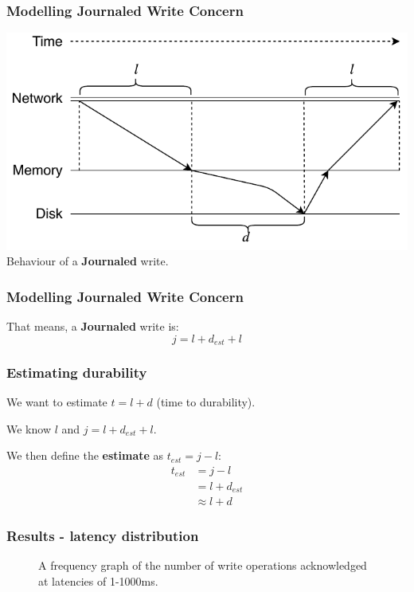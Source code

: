 \documentclass[numfooter,sectionpages,protectFrameTitle, progressbar, cblock, valigncolumns, addlogo]{beamer}
\begin{document}
\begin{frame}
    \frametitle{Modelling Journaled Write Concern}
    \centering
    \includegraphics[height=.625\textheight]{../images/j_write.pdf} \\
    Behaviour of a \textbf{Journaled} write.
\end{frame}

\begin{frame}
    \frametitle{Modelling Journaled Write Concern}
    That means, a \textbf{Journaled} write is:
    \[
        j = l + d_{est} + l
    \]
\end{frame}

\begin{frame}
    \frametitle{Estimating durability}

    We want to estimate $t = l + d$ (time to durability).

    We know $l$ and $j = l + d_{est} + l$.

    We then define the \textbf{estimate} as $t_{est} = j - l$:
    \begin{align*}
        t_{est}     &= j - l \\
              &= l + d_{est} \\
              &\approx l + d
    \end{align*}
\end{frame}

\begin{frame}
    \frametitle{Results - latency distribution}

    \begin{figure}
        \centering        
        \scalebox{.5}{}
        \caption{A frequency graph of the number of write operations acknowledged at latencies of 1-1000ms.}
    \end{figure}

\end{frame}
\end{document}
